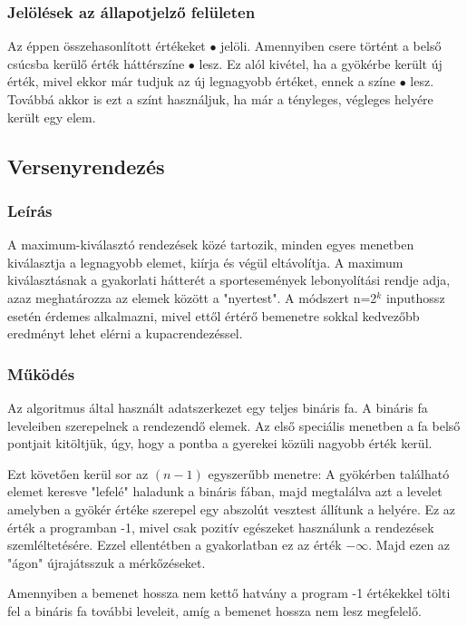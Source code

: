 \documentclass{elteikthesis}
\begin{document}
\subsubsection{Jelölések az állapotjelző felületen}
Az éppen összehasonlított értékeket \textcolor{swap}{\Huge$\bullet$} jelöli. Amennyiben csere történt a belső csúcsba kerülő érték háttérszíne \textcolor{select}{\Huge$\bullet$} lesz. Ez alól kivétel, ha a gyökérbe került új érték, mivel ekkor már tudjuk az új legnagyobb értéket, ennek a színe \textcolor{done}{\Huge$\bullet$} lesz. Továbbá akkor is ezt a színt használjuk, ha már a tényleges, végleges helyére került egy elem.

\subsection{Versenyrendezés}
\subsubsection{Leírás}
A maximum-kiválasztó rendezések közé tartozik, minden egyes menetben kiválasztja a legnagyobb elemet, kiírja és végül eltávolítja. A maximum kiválasztásnak a gyakorlati hátterét a sportesemények lebonyolítási rendje adja, azaz meghatározza az elemek között a "nyertest"\cite{Fekete}. A módszert n=2$^k$ inputhossz esetén érdemes alkalmazni, mivel ettől értérő bemenetre sokkal kedvezőbb eredményt lehet elérni a kupacrendezéssel\cite{Fekete}. \par
\subsubsection{Működés}
Az algoritmus által használt adatszerkezet egy teljes bináris fa. A bináris fa leveleiben szerepelnek a rendezendő elemek. Az első speciális menetben a fa belső pontjait kitöltjük, úgy, hogy a pontba a gyerekei közüli nagyobb érték kerül.\par 
Ezt követően kerül sor az $(n-1)$ egyszerűbb menetre: A gyökérben található elemet keresve "lefelé" haladunk a bináris fában, majd megtalálva azt a levelet amelyben a gyökér értéke szerepel egy abszolút vesztest állítunk a helyére. Ez az érték a programban -1, mivel csak pozitív egészeket használunk a rendezések szemléltetésére. Ezzel ellentétben a gyakorlatban ez az érték $-\infty$. Majd ezen az "ágon" újrajátsszuk a mérkőzéseket.\par
Amennyiben a bemenet hossza nem kettő hatvány a program -1 értékekkel tölti fel a bináris fa további leveleit, amíg a bemenet hossza nem lesz megfelelő.
\end{document}
